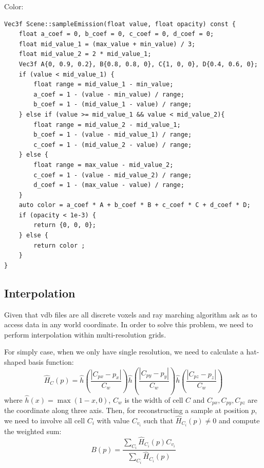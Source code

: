 \documentclass[acmtog]{acmart}
\begin{document}
    Color:

    \begin{lstlisting}[label={lst:lstlisting5}]
Vec3f Scene::sampleEmission(float value, float opacity) const {
    float a_coef = 0, b_coef = 0, c_coef = 0, d_coef = 0;
    float mid_value_1 = (max_value + min_value) / 3;
    float mid_value_2 = 2 * mid_value_1;
    Vec3f A{0, 0.9, 0.2}, B{0.8, 0.8, 0}, C{1, 0, 0}, D{0.4, 0.6, 0};
    if (value < mid_value_1) {
        float range = mid_value_1 - min_value;
        a_coef = 1 - (value - min_value) / range;
        b_coef = 1 - (mid_value_1 - value) / range;
    } else if (value >= mid_value_1 && value < mid_value_2){
        float range = mid_value_2 - mid_value_1;
        b_coef = 1 - (value - mid_value_1) / range;
        c_coef = 1 - (mid_value_2 - value) / range;
    } else {
        float range = max_value - mid_value_2;
        c_coef = 1 - (value - mid_value_2) / range;
        d_coef = 1 - (max_value - value) / range;
    }
    auto color = a_coef * A + b_coef * B + c_coef * C + d_coef * D;
    if (opacity < 1e-3) {
        return {0, 0, 0};
    } else {
        return color ;
    }
}
    \end{lstlisting}

    \subsection{Interpolation}\label{subsec:interpolation}
    Given that vdb files are all discrete voxels and ray marching algorithm ask as to access data in any world coordinate.
    In order to solve this problem, we need to perform interpolation within multi-resolution grids.

    For simply case, when we only have single resolution, we need to calculate a hat-shaped basis function:
    \begin{equation}
        \hat{H}_C(p) = \hat{h}\left( \frac{|C_{px}-p_x|}{C_w} \right)\hat{h}\left( \frac{|C_{py}-p_y|}{C_w} \right)\hat{h}\left( \frac{|C_{pz}-p_z|}{C_w} \right)\label{eq:equation2}
    \end{equation}
    where $\hat{h}(x) = \max(1-x,0) $, $C_w$ is the width of cell $C$ and $C_{px}, C_{py}, C_{pz}$ are the coordinate along three axis.
    Then, for reconstructing a sample at position $p$, we need to involve all cell $C_i$ with value $C_{v_i}$ such that $\hat{H}_{C_i}(p) \neq 0$ and compute the weighted sum:
    \begin{equation}
        B(p)=\frac{\sum_{C_i} \hat{H}_{C_i}(p)C_{v_i}}{\sum_{C_i}\hat{H}_{C_i}(p)}\label{eq:equation3}
    \end{equation}
\end{document}
